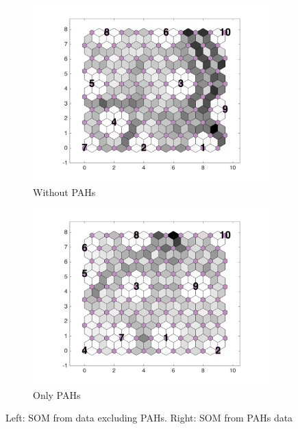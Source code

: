 \begin{figure}
    \begin{subfigure}[b]{0.5\textwidth}
        \centering
        \includegraphics[width=\textwidth]{../../images0.01/M31/2D/diff_dimension/combine_2D_data_between_cols11and26.png}
    \caption{Without PAHs}
    \label{fig: wt_pahs}
    \end{subfigure}
    \hfill
    \begin{subfigure}[b]{0.5\textwidth}
        \includegraphics[width=\textwidth]{../../images0.01/M31/2D/diff_dimension/combine_2D_data_between_cols3and10.png}
    \caption{Only PAHs}
    \label{fig: only_pahs}
    \end{subfigure}
    \caption{Left: SOM from data excluding PAHs. Right: SOM from PAHs data}
    \label{fig: PAHS_or_not_PAHs}
\end{figure}